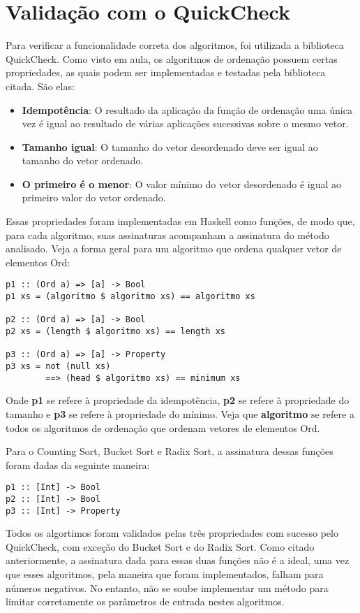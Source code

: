 \documentclass[12pt,a4paper]{article}
\begin{document}
\section{Validação com o QuickCheck}
Para verificar a funcionalidade correta dos algoritmos, foi utilizada a biblioteca QuickCheck. Como visto em aula, os algoritmos de ordenação possuem certas propriedades, as quais podem ser implementadas e testadas pela biblioteca citada. São elas:
\begin{itemize}
\item \textbf{Idempotência}: O resultado da aplicação da função de ordenação uma única vez é igual ao resultado de várias aplicações sucessivas sobre o mesmo vetor.
\item \textbf{Tamanho igual}: O tamanho do vetor desordenado deve ser igual ao tamanho do vetor ordenado.
\item \textbf{O primeiro é o menor}: O valor mínimo do vetor desordenado é igual ao primeiro valor do vetor ordenado.
\end{itemize}

Essas propriedades foram implementadas em Haskell como funções, de modo que, para cada algoritmo, suas assinaturas acompanham a assinatura do método analisado. Veja a forma geral para um algoritmo que ordena qualquer vetor de elementos Ord:

\begin{lstlisting}
p1 :: (Ord a) => [a] -> Bool
p1 xs = (algoritmo $ algoritmo xs) == algoritmo xs

p2 :: (Ord a) => [a] -> Bool
p2 xs = (length $ algoritmo xs) == length xs

p3 :: (Ord a) => [a] -> Property
p3 xs = not (null xs)
        ==> (head $ algoritmo xs) == minimum xs
\end{lstlisting}

Onde \textbf{p1} se refere à propriedade da idempotência, \textbf{p2} se refere à propriedade do tamanho e \textbf{p3} se refere à propriedade do mínimo. Veja que \textbf{algoritmo} se refere a todos os algoritmos de ordenação que ordenam vetores de elementos Ord.


Para o Counting Sort, Bucket Sort e Radix Sort, a assinatura dessas funções foram dadas da seguinte maneira: 
\begin{lstlisting}
p1 :: [Int] -> Bool
p2 :: [Int] -> Bool
p3 :: [Int] -> Property
\end{lstlisting}

Todos os algortimos foram validados pelas três propriedades com sucesso pelo QuickCheck, com exceção do Bucket Sort e do Radix Sort. Como citado anteriormente, a assinatura dada para essas duas funções não é a ideal, uma vez que esses algoritmos, pela maneira que foram implementados, falham para números negativos. No entanto, não se soube implementar um método para limitar corretamente os parâmetros de entrada nestes algoritmos.
\end{document}
